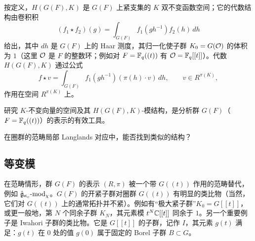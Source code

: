 按定义，$H(G(F),K)$ 是 $G(F)$ 上紧支集的 $K$ 双不变函数空间；它的代数结构由卷积积
\begin{equation}
    (f_1\star f_2)(g)=\int_{G(F)}f_1(gh^{-1})f_2(h)\,dh
    \tag{10.2-1}
\end{equation}
给出，其中 $dh$ 是 $G(F)$ 上的 Haar 测度，其归一化使子群 $K_0=G(\mathcal{O})$ 的体积为 $1$（这里 $\mathcal{O}$ 是 $F$ 的整数环；例如对 $F=\mathbb{F}_q((t))$ 有 $\mathcal{O}=\mathbb{F}_q[[t]]$）。代数 $H(G(F),K)$ 通过公式
\begin{equation}
    f\star v=\int_{G(F)}f_1(gh^{-1})(\pi(h)\cdot v)\,dh,
    \qquad v\in R^{\pi(K)},
    \tag{10.2-2}
\end{equation}
作用在空间 $R^{\pi(K)}$ 上。

研究 $K$-不变向量的空间及其 $H(G(F),K)$-模结构，是分析群 $G(F)$（$F=\mathbb{F}_q((t))$）的表示的有效工具。

在圈群的范畴局部 Langlands 对应中，能否找到类似的结构？

\subsection{等变模}

在范畴情形，群 $G(F)$ 的表示 $(R,\pi)$ 被一个带 $G((t))$ 作用的范畴替代，例如 $\hat{\mathfrak{g}}_{\kappa_c}\text{-}\mathrm{mod}_\chi$。$G(F)$ 的开紧子群对圈群 $G((t))$ 有明显的类比物（当然，它们对 $G((t))$ 上的通常拓扑并不紧）。例如有“极大紧子群”$K_0=G[[t]]$，或更一般地，第 $N$ 个同余子群 $K_N$，其元素模 $t^N\mathbb{C}[[t]]$ 同余于 $1$。另一个重要例子是 Iwahori 子群的类比物。它是 $G[[t]]$ 的子群，记作 $I$，其元素 $g(t)$ 满足：$g(t)$ 在 $0$ 处的值 $g(0)$ 属于固定的 Borel 子群 $B\subset G$。

